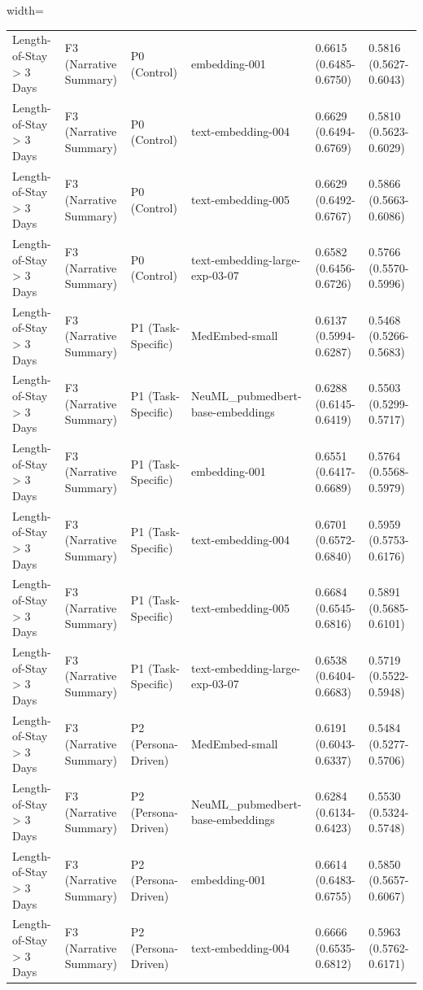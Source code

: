 \documentclass[border=0pt]{standalone}
\begin{document}
\begin{adjustbox}{width=\textwidth}
\begin{tabular}{llllll}
Length-of-Stay \textgreater{} 3 Days & F3 (Narrative Summary) & P0 (Control) & embedding-001 & 0.6615 (0.6485-0.6750) & 0.5816 (0.5627-0.6043) \\
Length-of-Stay \textgreater{} 3 Days & F3 (Narrative Summary) & P0 (Control) & text-embedding-004 & 0.6629 (0.6494-0.6769) & 0.5810 (0.5623-0.6029) \\
Length-of-Stay \textgreater{} 3 Days & F3 (Narrative Summary) & P0 (Control) & text-embedding-005 & 0.6629 (0.6492-0.6767) & 0.5866 (0.5663-0.6086) \\
Length-of-Stay \textgreater{} 3 Days & F3 (Narrative Summary) & P0 (Control) & text-embedding-large-exp-03-07 & 0.6582 (0.6456-0.6726) & 0.5766 (0.5570-0.5996) \\
Length-of-Stay \textgreater{} 3 Days & F3 (Narrative Summary) & P1 (Task-Specific) & MedEmbed-small & 0.6137 (0.5994-0.6287) & 0.5468 (0.5266-0.5683) \\
Length-of-Stay \textgreater{} 3 Days & F3 (Narrative Summary) & P1 (Task-Specific) & NeuML\_pubmedbert-base-embeddings & 0.6288 (0.6145-0.6419) & 0.5503 (0.5299-0.5717) \\
Length-of-Stay \textgreater{} 3 Days & F3 (Narrative Summary) & P1 (Task-Specific) & embedding-001 & 0.6551 (0.6417-0.6689) & 0.5764 (0.5568-0.5979) \\
Length-of-Stay \textgreater{} 3 Days & F3 (Narrative Summary) & P1 (Task-Specific) & text-embedding-004 & 0.6701 (0.6572-0.6840) & 0.5959 (0.5753-0.6176) \\
Length-of-Stay \textgreater{} 3 Days & F3 (Narrative Summary) & P1 (Task-Specific) & text-embedding-005 & 0.6684 (0.6545-0.6816) & 0.5891 (0.5685-0.6101) \\
Length-of-Stay \textgreater{} 3 Days & F3 (Narrative Summary) & P1 (Task-Specific) & text-embedding-large-exp-03-07 & 0.6538 (0.6404-0.6683) & 0.5719 (0.5522-0.5948) \\
Length-of-Stay \textgreater{} 3 Days & F3 (Narrative Summary) & P2 (Persona-Driven) & MedEmbed-small & 0.6191 (0.6043-0.6337) & 0.5484 (0.5277-0.5706) \\
Length-of-Stay \textgreater{} 3 Days & F3 (Narrative Summary) & P2 (Persona-Driven) & NeuML\_pubmedbert-base-embeddings & 0.6284 (0.6134-0.6423) & 0.5530 (0.5324-0.5748) \\
Length-of-Stay \textgreater{} 3 Days & F3 (Narrative Summary) & P2 (Persona-Driven) & embedding-001 & 0.6614 (0.6483-0.6755) & 0.5850 (0.5657-0.6067) \\
Length-of-Stay \textgreater{} 3 Days & F3 (Narrative Summary) & P2 (Persona-Driven) & text-embedding-004 & 0.6666 (0.6535-0.6812) & 0.5963 (0.5762-0.6171) \\

\end{tabular}
\end{adjustbox}
\end{document}
